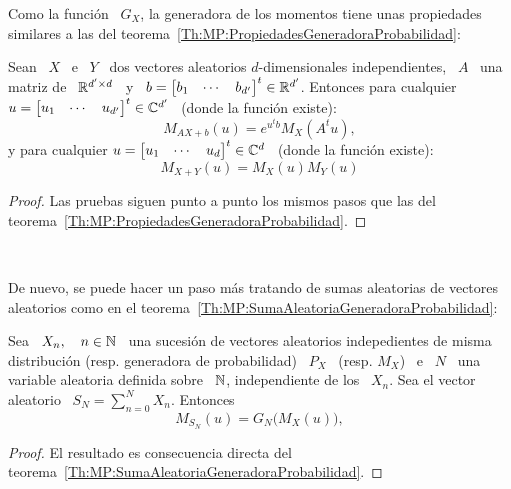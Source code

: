 Como la funci\'on \ $G_X$, la  generadora de los momentos tiene unas propiedades
similares a las del teorema~\ref{Th:MP:PropiedadesGeneradoraProbabilidad}:
%
\begin{teorema}%
\label{Th:MP:PropiedadesGeneradoraMomentos}
Sean \ $X$ \ e \ $Y$ \ dos vectores aleatorios $d$-dimensionales independientes,
\ $A$ \ una  matriz de \ $\mathbb{R}^{d' \times d}$ \ y \  $b = \begin{bmatrix} b_1 &
  \cdots &  b_{d'} \end{bmatrix}^t \in  \mathbb{R}^{d'}$. Entonces para  cualquier $u
= \begin{bmatrix} u_1 & \cdots & u_{d'} \end{bmatrix}^t \in \mathbb{C}^{d'}$ \ (donde
la funci\'on existe):
  \[
  M_{A X + b}(u) =  e^{u^t b} M_X\left( A^t u \right),
  \]
  y para cualquier  $u = \begin{bmatrix} u_1 & \cdots  & u_d \end{bmatrix}^t \in
  \mathbb{C}^d$ \ (donde la funci\'on existe):
  \[
  M_{X+Y}(u) = M_X(u) M_Y(u)
  \]
\end{teorema}
%
\begin{proof}
  Las   pruebas  siguen   punto  a   punto  los   mismos  pasos   que   las  del
  teorema~\ref{Th:MP:PropiedadesGeneradoraProbabilidad}.
\end{proof}

\

De nuevo, se puede hacer un  paso m\'as tratando de sumas aleatorias de vectores
aleatorios como en el teorema~\ref{Th:MP:SumaAleatoriaGeneradoraProbabilidad}:
%
\begin{teorema}\label{Th:MP:SumaAleatoriaGeneradoraMomentos}
  Sea  \ $X_n,  \quad n  \in  \mathbb{N}$ \,  una sucesi\'on  de vectores  aleatorios
  indepedientes de  misma distribuci\'on  (resp.  generadora de  probabilidad) \
  $P_X$ \  (resp. $M_X$) \  e \  $N$ \ una  variable aleatoria definida  sobre \
  $\mathbb{N}$,  independiente de los  \ $X_n$.  Sea el  vector aleatorio  \ $  S_N =
  \sum_{n=0}^N X_n$. Entonces
  \[
  M_{S_N}(u) =  G_N \big( M_X(u) \big),
  \]
\end{teorema}
%
\begin{proof}
  El         resultado        es         consecuencia         directa        del
  teorema~\ref{Th:MP:SumaAleatoriaGeneradoraProbabilidad}.
\end{proof}



